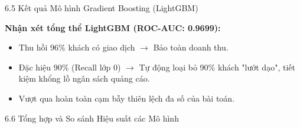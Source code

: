 \documentclass[aspectratio=169, 11pt]{beamer}
\begin{document}
\begin{frame}{6.5 Kết quả Mô hình Gradient Boosting (LightGBM)}
    \begin{table}[H]
        \centering
        \caption{Báo cáo kết quả phân loại (LightGBM)}
    \end{table}

    \textbf{Nhận xét tổng thể LightGBM (ROC-AUC: 0.9699):}
    \begin{itemize}
        \item Thu hồi 96\% khách có giao dịch $\rightarrow$ Bảo toàn doanh thu.
        \item Đặc hiệu 90\% (Recall lớp 0) $\rightarrow$ Tự động loại bỏ 90\% khách "lướt dạo", tiết kiệm khổng lồ ngân sách quảng cáo.
        \item Vượt qua hoàn toàn cạm bẫy thiên lệch đa số của bài toán.
    \end{itemize}
\end{frame}
\begin{frame}{6.6 Tổng hợp và So sánh Hiệu suất các Mô hình}
    \begin{table}[H]
        \centering
        \caption{Bảng tổng hợp các chỉ số đánh giá trên tập Kiểm thử (Tập trung vào Nhãn 1: Có mua hàng)}
        \vspace{0.2cm}
    \end{table}
\end{frame}
\end{document}
